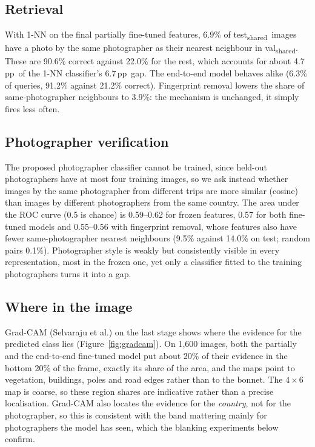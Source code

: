 \documentclass[11pt]{article}
\newcommand{\tsh}{test\textsubscript{shared}}
\newcommand{\vsh}{val\textsubscript{shared}}
\newcommand{\pp}{\,pp}
\begin{document}
\subsection{Retrieval}
With 1-NN on the final partially fine-tuned features, 6.9\% of \tsh\ images have a photo by the same
photographer as their nearest neighbour in \vsh. These are 90.6\% correct against 22.0\% for the rest, which
accounts for about 4.7\pp\ of the 1-NN classifier's 6.7\pp\ gap. The end-to-end model behaves alike (6.3\% of
queries, 91.2\% against 21.2\% correct). Fingerprint removal lowers the share of same-photographer neighbours
to 3.9\%: the mechanism is unchanged, it simply fires less often.

\subsection{Photographer verification}
The proposed photographer classifier cannot be trained, since held-out photographers have at most four
training images, so we ask instead whether images by the same photographer from different trips are more
similar (cosine) than images by different photographers from the same country. The area under the ROC
curve (0.5 is chance) is 0.59--0.62 for frozen features, 0.57 for both fine-tuned models and 0.55--0.56 with
fingerprint removal, whose features also have fewer same-photographer nearest neighbours (9.5\% against
14.0\% on test; random pairs 0.1\%). Photographer style is weakly but consistently visible in every
representation, most in the frozen one, yet only a classifier fitted to the training photographers turns
it into a gap.

\subsection{Where in the image}\label{sec:gradcam}
Grad-CAM (Selvaraju et al.) on the last stage shows where the evidence for the predicted class lies
(Figure~\ref{fig:gradcam}). On 1{,}600 images, both the partially and the end-to-end fine-tuned model put
about 20\% of their evidence in the bottom 20\% of the frame, exactly its share of the area, and the maps
point to vegetation, buildings, poles and road edges rather than to the bonnet. The $4\times6$ map is
coarse, so these region shares are indicative rather than a precise localisation. Grad-CAM also locates the
evidence for the \emph{country}, not for the photographer, so this is consistent with the band mattering
mainly for photographers the model has seen, which the blanking experiments below confirm.
\end{document}
